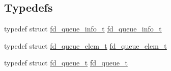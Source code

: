 \subsection*{Typedefs}
\begin{DoxyCompactItemize}
\item 
typedef struct \hyperlink{structfd__queue__info__t}{fd\+\_\+queue\+\_\+info\+\_\+t} \hyperlink{group__APACHE__MPM__WORKER_gae60bd20f632fdf018c59af8943651458}{fd\+\_\+queue\+\_\+info\+\_\+t}
\item 
typedef struct \hyperlink{structfd__queue__elem__t}{fd\+\_\+queue\+\_\+elem\+\_\+t} \hyperlink{group__APACHE__MPM__WORKER_ga05898396eb6f09bf84cdf03f6c4bea00}{fd\+\_\+queue\+\_\+elem\+\_\+t}
\item 
typedef struct \hyperlink{structfd__queue__t}{fd\+\_\+queue\+\_\+t} \hyperlink{group__APACHE__MPM__WORKER_gaecd41846d40f5570725f5cd670a3181b}{fd\+\_\+queue\+\_\+t}
\end{DoxyCompactItemize}
